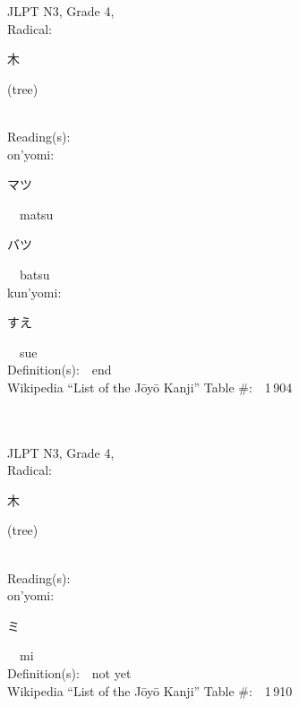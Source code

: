 \begin{multicols}{2}
{JLPT N3, Grade 4, \\Radical:\ \ {\begin{CJK}{UTF8}{min} 木 \end{CJK}} (tree) } \\
Reading(s):\ \ \\
{\hspace*{1em}}on'yomi:\ \ \\
{\hspace*{2em}}{\begin{CJK}{UTF8}{min} マツ \end{CJK}}\ \ matsu\ \ \\
{\hspace*{2em}}{\begin{CJK}{UTF8}{min} バツ \end{CJK}}\ \ batsu\ \ \\
{\hspace*{1em}}kun'yomi:\ \ \\
{\hspace*{2em}}{\begin{CJK}{UTF8}{min} すえ \end{CJK}}\ \ sue\ \ \\
Definition(s):\ \ end \\
Wikipedia ``List of the J\=oy\=o Kanji'' Table \#:\ \ 1\,904 \\
\ \ \\
{\fontsize{34pt}{40pt}  }\ \ \\  %
{JLPT N3, Grade 4, \\Radical:\ \ {\begin{CJK}{UTF8}{min} 木 \end{CJK}} (tree) } \\
Reading(s):\ \ \\
{\hspace*{1em}}on'yomi:\ \ \\
{\hspace*{2em}}{\begin{CJK}{UTF8}{min} ミ \end{CJK}}\ \ mi\ \ \\
Definition(s):\ \ not yet \\
Wikipedia ``List of the J\=oy\=o Kanji'' Table \#:\ \ 1\,910 \\
\ \ \\
{\fontsize{34pt}{40pt}  }\ \ \\  %

\end{multicols}
